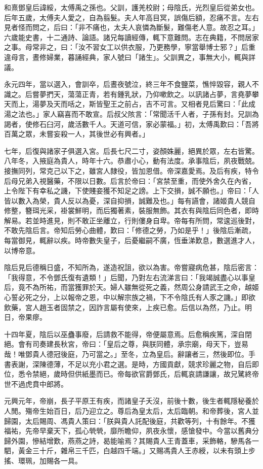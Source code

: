 \begin{pinyinscope}
和熹鄧皇后諱綏，太傅禹之孫也。父訓，護羌校尉；母陰氏，光烈皇后從弟女也。后年五歲，太傅夫人愛之，自為翦髮。夫人年高目冥，誤傷后額，忍痛不言。左右見者怪而問之，后曰：「非不痛也，太夫人哀憐為斷髮，難傷老人意。故忍之耳。」六歲能史書，十二通詩、論語。諸兄每讀經傳，輒下意難問。志在典籍，不問居家之事。母常非之，曰：「汝不習女工以供衣服，乃更務學，寧當舉博士邪？」后重違母言，晝修婦業，暮誦經典，家人號曰「諸生」。父訓異之，事無大小，輒與詳議。

永元四年，當以選入，會訓卒，后晝夜號泣，終三年不食鹽菜，憔悴毀容，親人不識之。后嘗夢捫天，蕩蕩正青，若有鍾乳狀，乃仰嗽飲之。以訊諸占夢，言堯夢攀天而上，湯夢及天而咶之，斯皆聖王之前占，吉不可言。又相者見后驚曰：「此成湯之法也。」家人竊喜而不敢宣。后叔父陔言：「常聞活千人者，子孫有封。兄訓為謁者，使修石臼河，歲活數千人。天道可信，家必蒙福。」初，太傅禹歎曰：「吾將百萬之眾，未嘗妄殺一人，其後世必有興者。」

七年，后復與諸家子俱選入宮。后長七尺二寸，姿顏姝麗，絕異於眾，左右皆驚。八年冬，入掖庭為貴人，時年十六。恭肅小心，動有法度。承事陰后，夙夜戰兢。接撫同列，常克己以下之，雖宮人隸役，皆加恩借。帝深嘉愛焉。及后有疾，特令后母兄弟入視醫藥，不限以日數。后言於帝曰：「宮禁至重，而使外舍久在內省，上令陛下有幸私之譏，下使賤妾獲不知足之謗。上下交損，誠不願也。」帝曰：「人皆以數入為榮，貴人反以為憂，深自抑損，誠難及也。」每有讌會，諸姬貴人競自修整，簪珥光采，褂裳鮮明，而后獨著素，裝服無飾。其衣有與陰后同色者，即時解易。若並時進見，則不敢正坐離立，行則僂身自卑。帝每有所問，常逡巡後對，不敢先陰后言。帝知后勞心曲體，歎曰：「修德之勞，乃如是乎！」後陰后漸疏，每當御見，輒辭以疾。時帝數失皇子，后憂繼嗣不廣，恆垂涕歎息，數選進才人，以博帝意。

陰后見后德稱日盛，不知所為，遂造祝詛，欲以為害。帝嘗寢病危甚，陰后密言：「我得意，不令鄧氏復有遺類！」后聞，乃對左右流涕言曰：「我竭誠盡心以事皇后，竟不為所祐，而當獲罪於天。婦人雖無從死之義，然周公身請武王之命，越姬心誓必死之分，上以報帝之恩，中以解宗族之禍，下不令陰氏有人豕之譏。」即欲飲藥，宮人趙玉者固禁之，因詐言屬有使來，上疾已愈。后信以為然，乃止。明日，帝果瘳。

十四年夏，陰后以巫蠱事廢，后請救不能得，帝便屬意焉。后愈稱疾篤，深自閉絕。會有司奏建長秋宮，帝曰：「皇后之尊，與朕同體，承宗廟，母天下，豈易哉！唯鄧貴人德冠後庭，乃可當之。」至冬，立為皇后。辭讓者三，然後即位。手書表謝，深陳德薄，不足以充小君之選。是時，方國貢獻，競求珍麗之物，自后即位，悉令禁絕，歲時但供紙墨而已。帝每欲官爵鄧氏，后輒哀請謙讓，故兄騭終帝世不過虎賁中郎將。

元興元年，帝崩，長子平原王有疾，而諸皇子夭沒，前後十數，後生者輒隱秘養於人閒。殤帝生始百日，后乃迎立之。尊后為皇太后，太后臨朝。和帝葬後，宮人並歸園，太后賜周、馮貴人策曰：「朕與貴人託配後庭，共歡等列，十有餘年。不獲福祐，先帝早棄天下，孤心煢煢，靡所瞻仰，夙夜永懷，感愴發中。今當以舊典分歸外園，慘結增歎，燕燕之詩，曷能喻焉？其賜貴人王青蓋車，采飾輅，驂馬各一駟，黃金三十斤，雜帛三千匹，白越四千端。」又賜馮貴人王赤綬，以未有頭上步搖、環珮，加賜各一具。


\end{pinyinscope}
